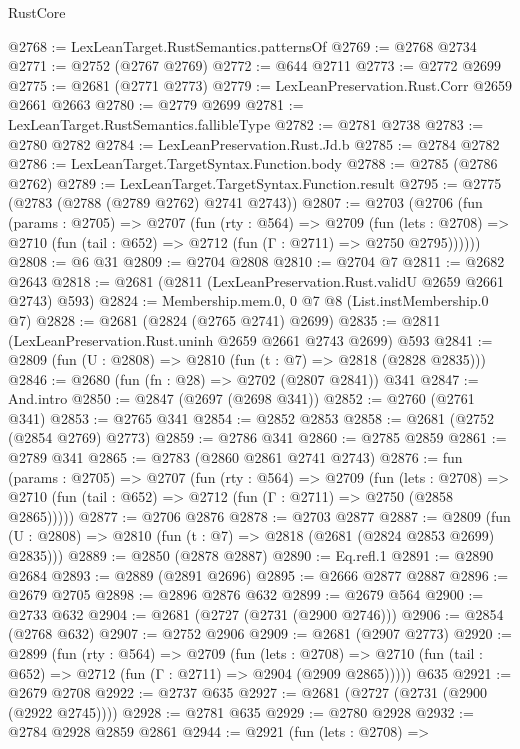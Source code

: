 \begin{lexlean}{RustCore}
\begin{coremodule}
@2768 := LexLeanTarget.RustSemantics.patternsOf
@2769 := @2768 @2734
@2771 := @2752 (@2767 @2769)
@2772 := @644 @2711
@2773 := @2772 @2699
@2775 := @2681 (@2771 @2773)
@2779 := LexLeanPreservation.Rust.Corr @2659 @2661 @2663
@2780 := @2779 @2699
@2781 := LexLeanTarget.RustSemantics.fallibleType
@2782 := @2781 @2738
@2783 := @2780 @2782
@2784 := LexLeanPreservation.Rust.Jd.b
@2785 := @2784 @2782
@2786 := LexLeanTarget.TargetSyntax.Function.body
@2788 := @2785 (@2786 @2762)
@2789 := LexLeanTarget.TargetSyntax.Function.result
@2795 := @2775 (@2783 (@2788 (@2789 @2762) @2741 @2743))
@2807 := @2703
    (@2706
      (fun (params : @2705) =>
      @2707
        (fun (rty : @564) =>
        @2709
          (fun (lets : @2708) =>
          @2710 (fun (tail : @652) => @2712 (fun (Γ : @2711) => @2750 @2795))))))
@2808 := @6 @31
@2809 := @2704 @2808
@2810 := @2704 @7
@2811 := @2682 @2643
@2818 := @2681 (@2811 (LexLeanPreservation.Rust.validU @2659 @2661 @2743) @593)
@2824 := Membership.mem.{0, 0} @7 @8 (List.instMembership.{0} @7)
@2828 := @2681 (@2824 (@2765 @2741) @2699)
@2835 := @2811 (LexLeanPreservation.Rust.uninh @2659 @2661 @2743 @2699) @593
@2841 := @2809 (fun (U : @2808) => @2810 (fun (t : @7) => @2818 (@2828 @2835)))
@2846 := @2680 (fun (fn : @28) => @2702 (@2807 @2841)) @341
@2847 := And.intro
@2850 := @2847 (@2697 (@2698 @341))
@2852 := @2760 (@2761 @341)
@2853 := @2765 @341
@2854 := @2852 @2853
@2858 := @2681 (@2752 (@2854 @2769) @2773)
@2859 := @2786 @341
@2860 := @2785 @2859
@2861 := @2789 @341
@2865 := @2783 (@2860 @2861 @2741 @2743)
@2876 := fun (params : @2705) =>
  @2707
    (fun (rty : @564) =>
    @2709
      (fun (lets : @2708) =>
      @2710 (fun (tail : @652) => @2712 (fun (Γ : @2711) => @2750 (@2858 @2865)))))
@2877 := @2706 @2876
@2878 := @2703 @2877
@2887 := @2809 (fun (U : @2808) => @2810 (fun (t : @7) => @2818 (@2681 (@2824 @2853 @2699) @2835)))
@2889 := @2850 (@2878 @2887)
@2890 := Eq.refl.{1}
@2891 := @2890 @2684
@2893 := @2889 (@2891 @2696)
@2895 := @2666 @2877 @2887
@2896 := @2679 @2705
@2898 := @2896 @2876 @632
@2899 := @2679 @564
@2900 := @2733 @632
@2904 := @2681 (@2727 (@2731 (@2900 @2746)))
@2906 := @2854 (@2768 @632)
@2907 := @2752 @2906
@2909 := @2681 (@2907 @2773)
@2920 := @2899
    (fun (rty : @564) =>
    @2709
      (fun (lets : @2708) =>
      @2710 (fun (tail : @652) => @2712 (fun (Γ : @2711) => @2904 (@2909 @2865)))))
    @635
@2921 := @2679 @2708
@2922 := @2737 @635
@2927 := @2681 (@2727 (@2731 (@2900 (@2922 @2745))))
@2928 := @2781 @635
@2929 := @2780 @2928
@2932 := @2784 @2928 @2859 @2861
@2944 := @2921
    (fun (lets : @2708) =>

\end{coremodule}
\end{lexlean}
